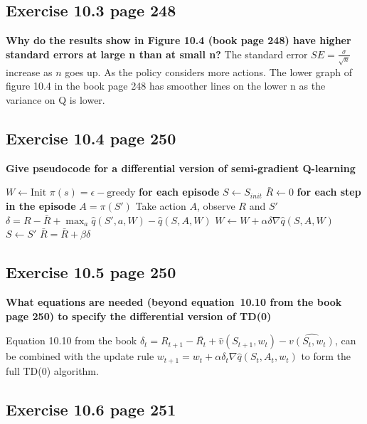 \subsection{Exercise 10.3 page 248}
\textbf{Why do the results show in Figure 10.4 (book page 248) have higher standard errors at large n than at small n?}
The standard error $SE=\frac{\sigma}{\sqrt{n}}$ increase as $n$ goes up. As the policy considers more actions. The lower graph of figure 10.4 in the book page 248 has smoother lines on the lower n as the variance on Q is lower.

\subsection{Exercise 10.4 page 250}
\textbf{Give pseudocode for a differential version of semi-gradient Q-learning}

\begin{algorithmic}
\State $W \gets \text{Init}$
\State $\pi(s)=\epsilon - \text{greedy}$
\Loop \space \textbf{for each episode}
\State $S \gets S_{init}$
\State $\bar{R} \gets 0$
\Loop \space \textbf{for each step in the episode}
\State $A = \pi(S')$
\State Take action $A$, observe $R$ and $S'$
\State $\delta = R -\bar{R} + \max_a\hat{q}(S', a, W) - \hat{q}(S, A, W)$
\State $W \gets W + \alpha \delta \nabla \hat{q}(S, A, W)$
\State $S \gets S'$
\State $\bar{R} = \bar{R} + \beta \delta$
\EndLoop

\EndLoop
\end{algorithmic}

\subsection{Exercise 10.5 page 250}
 \textbf{What equations are needed (beyond equation~10.10 from the book page 250) to specify the differential version of TD(0)}
 
 Equation 10.10 from the book $\delta_t = R_{t+1} - \bar{R_t} + \hat{v}(S_{t+1}, w_t) - \hat{v(S_t, w_t)} $, can be combined with the update rule $w_{t+1} = w_t + \alpha \delta_t \nabla \hat{q}(S_t, A_t, w_t)$ to form the full TD(0) algorithm.

\subsection{Exercise 10.6 page 251}

